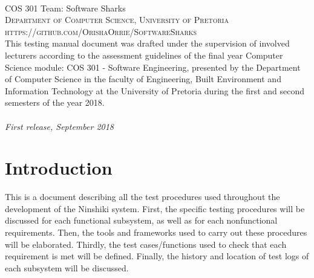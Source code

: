 \documentclass[a4paper, 11pt]{article}
\begin{document}
\pagebreak


\newpage
~\vfill
\thispagestyle{empty}

\noindent COS 301 Team: Software Sharks\\ 

\noindent \textsc{Department of Computer Science, University of Pretoria}\\

\noindent \textsc{https://github.com/OrishaOrrie/SoftwareSharks}\\ %

\noindent This testing manual document was drafted under the supervision of involved lecturers according to the assessment guidelines of the final year Computer Science module: COS 301 - Software Engineering, presented by the Department of Computer Science in the faculty of Engineering, Built Environment and Information Technology at the University of Pretoria during the first and second semesters of the year 2018. \\ \\

\noindent \textit{First release, September 2018} %

\pagebreak

\tableofcontents

\pagebreak


\section{Introduction}
This is a document describing all the test procedures used throughout the development of the Ninshiki system. First, the specific testing procedures will be discussed for each functional subsystem, as well as for each nonfunctional requirements. Then, the tools and frameworks used to carry out these procedures will be elaborated. Thirdly, the test cases/functions used to check that each requirement is met will be defined. Finally, the history and location of test logs of each subsystem will be discussed.
\end{document}
